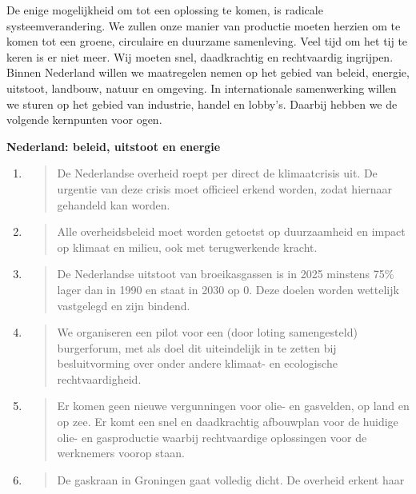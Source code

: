 De enige mogelijkheid om tot een oplossing te komen, is radicale
systeemverandering. We zullen onze manier van productie moeten herzien
om te komen tot een groene, circulaire en duurzame samenleving. Veel
tijd om het tij te keren is er niet meer. Wij moeten snel, daadkrachtig
en rechtvaardig ingrijpen. Binnen Nederland willen we maatregelen nemen
op het gebied van beleid, energie, uitstoot, landbouw, natuur en
omgeving. In internationale samenwerking willen we sturen op het gebied
van industrie, handel en lobby's. Daarbij hebben we de volgende
kernpunten voor ogen.

\textbf{Nederland: beleid, uitstoot en energie}

\begin{enumerate}
\def\labelenumi{\arabic{enumi}.}
\item
  \begin{quote}
  De Nederlandse overheid roept per direct de klimaatcrisis uit. De
  urgentie van deze crisis moet officieel erkend worden, zodat hiernaar
  gehandeld kan worden.
  \end{quote}
\item
  \begin{quote}
  Alle overheidsbeleid moet worden getoetst op duurzaamheid en impact op
  klimaat en milieu, ook met terugwerkende kracht.
  \end{quote}
\item
  \begin{quote}
  De Nederlandse uitstoot van broeikasgassen is in 2025 minstens 75\%
  lager dan in 1990 en staat in 2030 op 0. Deze doelen worden wettelijk
  vastgelegd en zijn bindend.
  \end{quote}
\item
  \begin{quote}
  We organiseren een pilot voor een (door loting samengesteld)
  burgerforum, met als doel dit uiteindelijk in te zetten bij
  besluitvorming over onder andere klimaat- en ecologische
  rechtvaardigheid.
  \end{quote}
\item
  \begin{quote}
  Er komen geen nieuwe vergunningen voor olie- en gasvelden, op land en
  op zee. Er komt een snel en daadkrachtig afbouwplan voor de huidige
  olie- en gasproductie waarbij rechtvaardige oplossingen voor de
  werknemers voorop staan.
  \end{quote}
\item
  \begin{quote}
  De gaskraan in Groningen gaat volledig dicht. De overheid erkent haar

\end{quote}
\end{enumerate}
